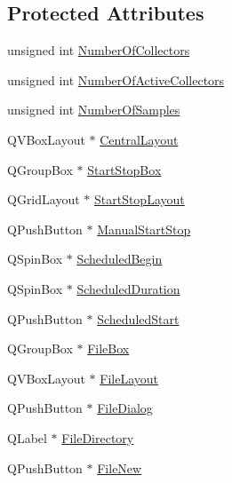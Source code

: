 \subsection*{Protected Attributes}
\begin{DoxyCompactItemize}
\item 
unsigned int \hyperlink{classmts_collector_qt_widget_a279a3e42bf7a0e6839ee158fc93f7d11}{Number\-Of\-Collectors}
\item 
unsigned int \hyperlink{classmts_collector_qt_widget_a69a07e5364bc6b04865cc02f241f3dab}{Number\-Of\-Active\-Collectors}
\item 
unsigned int \hyperlink{classmts_collector_qt_widget_aec5112d28fd52db2a8a4cc141ffe66d0}{Number\-Of\-Samples}
\item 
Q\-V\-Box\-Layout $\ast$ \hyperlink{classmts_collector_qt_widget_a68704bf96828912bf60f4da1b2e4b21c}{Central\-Layout}
\item 
Q\-Group\-Box $\ast$ \hyperlink{classmts_collector_qt_widget_a9e0eccd6ea10c9446fbab9f1f721afc9}{Start\-Stop\-Box}
\item 
Q\-Grid\-Layout $\ast$ \hyperlink{classmts_collector_qt_widget_aee8a4e84213a4cbf7655b897c2913e75}{Start\-Stop\-Layout}
\item 
Q\-Push\-Button $\ast$ \hyperlink{classmts_collector_qt_widget_a6cf96a9aa4904185c960c8dc9a34ec77}{Manual\-Start\-Stop}
\item 
Q\-Spin\-Box $\ast$ \hyperlink{classmts_collector_qt_widget_a2ad2123d97d626a84a66634928c92e7f}{Scheduled\-Begin}
\item 
Q\-Spin\-Box $\ast$ \hyperlink{classmts_collector_qt_widget_a59b20c153b54016d10f950e44224290f}{Scheduled\-Duration}
\item 
Q\-Push\-Button $\ast$ \hyperlink{classmts_collector_qt_widget_ae7cef6bafd7aa1f4fcd06490a49d255e}{Scheduled\-Start}
\item 
Q\-Group\-Box $\ast$ \hyperlink{classmts_collector_qt_widget_a827f8b0d880b6425a417dacca2eb656b}{File\-Box}
\item 
Q\-V\-Box\-Layout $\ast$ \hyperlink{classmts_collector_qt_widget_acaafed83888553de79580c2e352f5def}{File\-Layout}
\item 
Q\-Push\-Button $\ast$ \hyperlink{classmts_collector_qt_widget_a7a8e39a5afad4d819164f7db40722e41}{File\-Dialog}
\item 
Q\-Label $\ast$ \hyperlink{classmts_collector_qt_widget_a31c1ee375fd6a31bc44dfc86d266a352}{File\-Directory}
\item 
Q\-Push\-Button $\ast$ \hyperlink{classmts_collector_qt_widget_a7dc4b786d47df9f772085870f413125a}{File\-New}

\end{DoxyCompactItemize}
